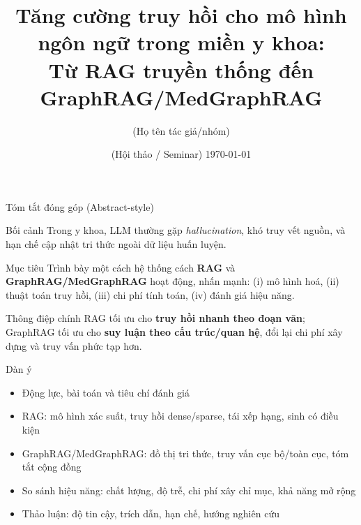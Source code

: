 \documentclass[aspectratio=169,10pt]{beamer}
\title[Hệ tăng cường truy hồi]{Tăng cường truy hồi cho mô hình ngôn ngữ trong miền y khoa:\\Từ RAG truyền thống đến GraphRAG/MedGraphRAG}
\author{(Họ tên tác giả/nhóm)}
\institute{(Đơn vị / Trường / Lab)}
\date{(Hội thảo / Seminar) \;\;\;\today}
\begin{document}
\begin{frame}
  \titlepage
\end{frame}

\begin{frame}{Tóm tắt đóng góp (Abstract-style)}
\small
\begin{block}{Bối cảnh}
Trong y khoa, LLM thường gặp \textit{hallucination}, khó truy vết nguồn, và hạn chế cập nhật tri thức ngoài dữ liệu huấn luyện.
\end{block}

\begin{block}{Mục tiêu}
Trình bày một cách hệ thống cách \textbf{RAG} và \textbf{GraphRAG/MedGraphRAG} hoạt động, nhấn mạnh: (i) mô hình hoá, (ii) thuật toán truy hồi, (iii) chi phí tính toán, (iv) đánh giá hiệu năng.
\end{block}

\begin{block}{Thông điệp chính}
RAG tối ưu cho \textbf{truy hồi nhanh theo đoạn văn}; GraphRAG tối ưu cho \textbf{suy luận theo cấu trúc/quan hệ}, đổi lại chi phí xây dựng và truy vấn phức tạp hơn.
\end{block}
\end{frame}

\begin{frame}{Dàn ý}
\small
\begin{itemize}
  \item Động lực, bài toán và tiêu chí đánh giá
  \item RAG: mô hình xác suất, truy hồi dense/sparse, tái xếp hạng, sinh có điều kiện
  \item GraphRAG/MedGraphRAG: đồ thị tri thức, truy vấn cục bộ/toàn cục, tóm tắt cộng đồng
  \item So sánh hiệu năng: chất lượng, độ trễ, chi phí xây chỉ mục, khả năng mở rộng
  \item Thảo luận: độ tin cậy, trích dẫn, hạn chế, hướng nghiên cứu
\end{itemize}
\end{frame}
\end{document}
